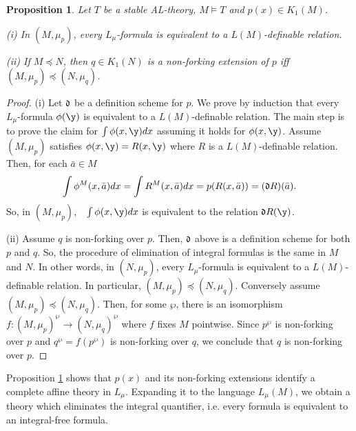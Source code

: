 \documentclass[12pt]{article}
\newtheorem{proposition}[theorem]{Proposition}
\def\a{\bar {a}}\def\b{\bar {b}}\def\c{\bar {c}}
\begin{document}
\begin{proposition}\label{def-scheme1}
Let $T$ be a stable AL-theory, $M\vDash T$ and $p(x)\in K_1(M)$.

(i) In $(M,\mu_p)$, every $L_\mu$-formula is equivalent to a $L(M)$-definable relation.

(ii) If $M\preccurlyeq N$, then $q\in K_1(N)$ is a non-forking extension of $p$ iff $(M,\mu_p)\preccurlyeq(N,\mu_q)$.
\end{proposition}
\begin{proof}
(i) Let $\frak d$ be a definition scheme for $p$. We prove by induction that every
$L_\mu$-formula $\phi(\y)$ is equivalent to a $L(M)$-definable relation.
The main step is to prove the claim for $\int\phi(x,\y)dx$ assuming it holds for $\phi(x,\y)$.
Assume $(M,\mu_p)$ satisfies $\phi(x,\y)=R(x,\y)$ where $R$ is a $L(M)$-definable relation.
Then, for each $\a\in M$ $$\int\phi^M(x,\a)dx=\int R^M(x,\a)dx=p(R(x,\a))=(\frak dR)(\a).$$
So, in $(M,\mu_p)$,\ \ $\int\phi(x,\y)dx$ is equivalent to the relation $\frak dR(\y)$.

(ii) Assume $q$ is non-forking over $p$. Then, $\frak d$ above is a definition scheme for both $p$ and $q$.
So, the procedure of elimination of integral formulas is the same in $M$ and $N$.
In other words, in $(N,\mu_p)$, every $L_\mu$-formula is equivalent to a $L(M)$-definable relation.
In particular, $(M,\mu_p)\preccurlyeq(N,\mu_q)$.
Conversely assume $(M,\mu_p)\preccurlyeq(N,\mu_q)$. Then, for some $\wp$, there is an isomorphism
$f:(M,\mu_p)^{\wp}\rightarrow(N,\mu_q)^{\wp}$ where $f$ fixes $M$ pointwise.
Since $p^\wp$ is non-forking over $p$ and $q^\wp=f(p^\wp)$ is non-forking over $q$, we conclude that $q$
is non-forking over $p$.
\end{proof}

Proposition \ref{def-scheme1} shows that $p(x)$ and its non-forking extensions identify a complete affine theory in $L_\mu$.
Expanding it to the language $L_\mu(M)$, we obtain a theory which eliminates the integral quantifier,
i.e. every formula is equivalent to an integral-free formula.
\bigskip
\end{document}
